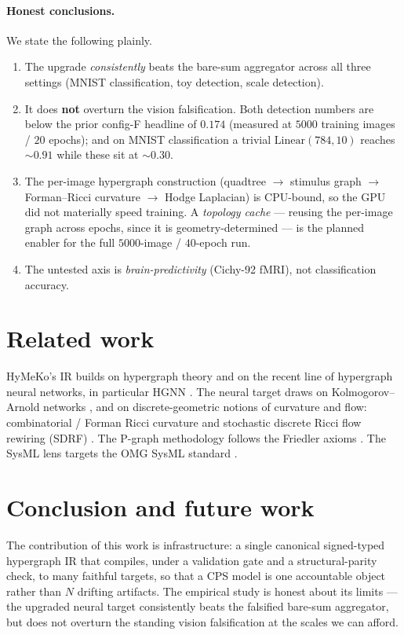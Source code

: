 \documentclass[11pt]{article}
\begin{document}
\paragraph{Honest conclusions.}
We state the following plainly.
\begin{enumerate}[leftmargin=1.6em]
  \item[(a)] The upgrade \emph{consistently} beats the bare-sum aggregator across
    all three settings (MNIST classification, toy detection, scale detection).
  \item[(b)] It does \textbf{not} overturn the vision falsification. Both
    detection numbers are below the prior config-F headline of $0.174$ (measured
    at $5000$ training images / $20$ epochs); and on MNIST classification a
    trivial $\mathrm{Linear}(784,10)$ reaches $\sim\!0.91$ while these sit at
    $\sim\!0.30$.
  \item[(c)] The per-image hypergraph construction (quadtree $\to$ stimulus graph
    $\to$ Forman--Ricci curvature $\to$ Hodge Laplacian) is CPU-bound, so the GPU
    did not materially speed training. A \emph{topology cache} --- reusing the
    per-image graph across epochs, since it is geometry-determined --- is the
    planned enabler for the full $5000$-image / $40$-epoch run.
  \item[(d)] The untested axis is \emph{brain-predictivity} (Cichy-92 fMRI), not
    classification accuracy.
\end{enumerate}

\section{Related work}
\label{sec:related}
HyMeKo's IR builds on hypergraph theory \cite{berge1973} and on the recent line
of hypergraph neural networks, in particular HGNN \cite{feng2019}. The neural
target draws on Kolmogorov--Arnold networks \cite{liu2024kan}, and on
discrete-geometric notions of curvature and flow: combinatorial / Forman Ricci
curvature \cite{forman2003} and stochastic discrete Ricci flow rewiring (SDRF)
\cite{topping2022}. The P-graph methodology follows the Friedler axioms
\cite{friedler1992}. The SysML lens targets the OMG SysML standard
\cite{omgsysml}.

\section{Conclusion and future work}
\label{sec:conclusion}
The contribution of this work is infrastructure: a single canonical
signed-typed hypergraph IR that compiles, under a validation gate and a
structural-parity check, to many faithful targets, so that a CPS model is one
accountable object rather than $N$ drifting artifacts. The empirical study is
honest about its limits --- the upgraded neural target consistently beats the
falsified bare-sum aggregator, but does not overturn the standing vision
falsification at the scales we can afford.
\end{document}
